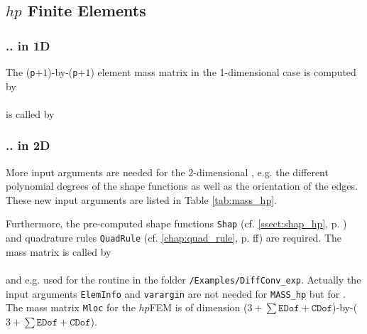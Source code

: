 \subsection{$hp$ Finite Elements} 

\subsubsection{.. in  1D}

 The ({\tt p}$+1$)-by-({\tt p}$+1$) element mass matrix  in the 1-dimensional case is computed by \\

 \\

  is called by \\


\subsubsection{.. in 2D}

 More input arguments are needed for the 2-dimensional , e.g. the different polynomial degrees of the shape functions as well as the orientation of the edges. These new input arguments are listed in Table \ref{tab:mass_hp}.



 Furthermore, the pre-computed shape functions {\tt Shap} (cf. \ref{ssect:shap_hp}, p. \pageref{ssect:shap_hp}) and quadrature rules {\tt QuadRule} (cf. \ref{chap:quad_rule}, p. \pageref{chap:quad_rule}ff) are required. The mass matrix is called by \\

 \\

 and e.g. used for the routine  in the folder {\tt /Examples/DiffConv\_exp}. Actually the input arguments {\tt ElemInfo} and {\tt varargin} are not needed for \linebreak
 {\tt MASS\_hp} but for . \\

 The mass matrix {\tt Mloc} for the $hp$FEM is of dimension ($3+\sum \mathtt{EDof}+ \mathtt{CDof}$)-by-($3+\sum \mathtt{EDof}+ \mathtt{CDof}$).


